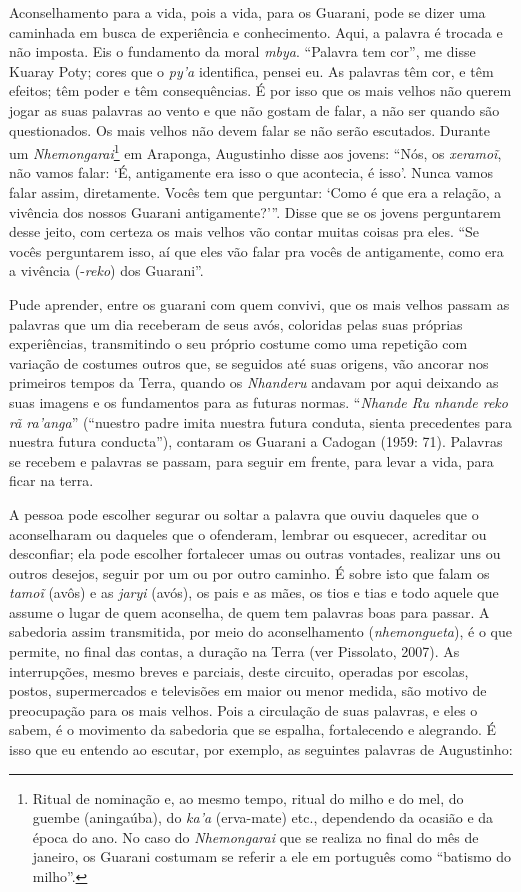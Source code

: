 Aconselhamento para a vida, pois a vida, para os Guarani, pode se dizer
uma caminhada em busca de experiência e conhecimento. Aqui, a palavra é
trocada e não imposta. Eis o fundamento da moral \emph{mbya}. ``Palavra tem
cor'', me disse Kuaray Poty; cores que o \emph{py’a} identifica, pensei eu. As
palavras têm cor, e têm efeitos; têm poder e têm consequências. É por
isso que os mais velhos não querem jogar as suas palavras ao vento e
que não gostam de falar, a não ser quando são questionados. Os mais velhos
não devem falar se não serão escutados. Durante um
\emph{Nhemongarai}\footnote{Ritual de nominação e, ao mesmo tempo, ritual do
milho e do mel, do guembe (aningaúba), do \emph{ka’a} (erva-mate) etc.,
dependendo da ocasião e da época do ano. No caso do \emph{Nhemongarai} que se
realiza no final do mês de janeiro, os Guarani costumam se referir a
ele em português como ``batismo do milho''.} em Araponga, Augustinho
disse aos jovens: ``Nós, os \emph{xeramoĩ}, não vamos falar: ‘É,
antigamente era isso o que acontecia, é isso’. Nunca vamos falar assim,
diretamente. Vocês tem que perguntar: ‘Como é que era a relação, a
vivência dos nossos Guarani antigamente?’''. Disse que se os jovens
perguntarem desse jeito, com certeza os mais velhos vão contar muitas
coisas pra eles. ``Se vocês perguntarem isso, aí que eles vão falar pra
vocês de antigamente, como era a vivência (-\emph{reko}) dos Guarani''. 

Pude aprender, entre os guarani com quem convivi, que os mais velhos
passam as palavras que um dia receberam de seus avós, coloridas pelas
suas próprias experiências, transmitindo o seu próprio costume como uma
repetição com variação de costumes outros que, se seguidos até suas
origens, vão ancorar nos primeiros tempos da Terra, quando os \emph{Nhanderu}
andavam por aqui deixando as suas imagens e os fundamentos para as
futuras normas. ``\emph{Nhande Ru nhande reko rã ra’anga}'' (``nuestro padre
imita nuestra futura conduta, sienta precedentes para nuestra futura
conducta''), contaram os Guarani a Cadogan (1959: 71). Palavras se
recebem e palavras se passam, para seguir em frente, para levar a vida,
para ficar na terra.

A pessoa pode escolher segurar ou soltar a palavra que ouviu daqueles
que o aconselharam ou daqueles que o ofenderam, lembrar ou esquecer,
acreditar ou desconfiar; ela pode escolher fortalecer umas ou outras
vontades, realizar uns ou outros desejos, seguir por um ou por outro
caminho. É sobre isto que falam os \emph{tamoĩ} (avôs) e as \emph{jaryi} (avós),
os pais e as mães, os tios e tias e todo aquele que assume o lugar de
quem aconselha, de quem tem palavras boas para passar. A sabedoria
assim transmitida, por meio do aconselhamento (\emph{nhemongueta}), é o que
permite, no final das contas, a duração na Terra (ver Pissolato, 2007).
As interrupções, mesmo breves e parciais, deste circuito, operadas por
escolas, postos, supermercados e televisões em maior ou menor medida,
são motivo de preocupação para os mais velhos. Pois a circulação de
suas palavras, e eles o sabem, é o movimento da sabedoria que se
espalha, fortalecendo e alegrando. É isso que eu entendo ao escutar,
por exemplo, as seguintes palavras de Augustinho:


